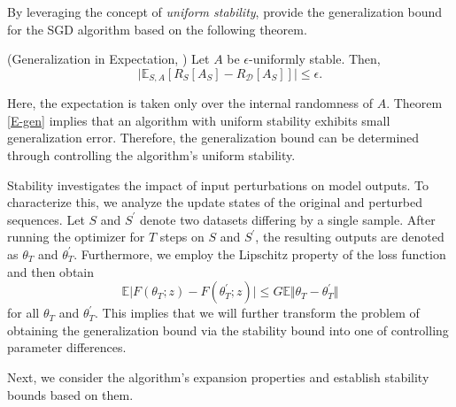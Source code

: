 By leveraging the concept of \emph{uniform stability}, \citet{hardt2016train} provide the generalization bound for the SGD algorithm based on the following theorem.
\begin{theorem}{\rm (Generalization in Expectation, \citet[Theorem 2.2]{hardt2016train})}\label{E-gen}
Let $A$ be $\epsilon$-uniformly stable. Then,
    \begin{equation}
     \vert\mathbb{E}_{S,A}\left[R_{S}\left[A_S\right]-R_\mathcal{D}\left[A_S\right]\right]\vert \leq \epsilon.
    \end{equation}
\end{theorem}

\begin{remark}
Here, the expectation is taken only over the internal randomness of $A$. Theorem \ref{E-gen} implies that an algorithm with uniform stability exhibits small generalization error. Therefore, the generalization bound can be determined through controlling the algorithm's uniform stability.   
\end{remark}


Stability investigates the impact of input perturbations on model outputs. To characterize this, we analyze the update states of the original and perturbed sequences. Let $S$ and $S^{\prime}$ denote two datasets differing by a single sample. After running the optimizer for $T$ steps on $S$ and $S^{\prime}$, the resulting outputs are denoted as $\theta_T$ and $\theta_T^{\prime}$. Furthermore, we employ the Lipschitz property of the loss function and then obtain
\begin{equation}\label{convex-basic}
\mathbb{E}\vert F(\theta_T;z)-F(\theta_T^{\prime};z)\vert \leq G \mathbb{E}\Vert \theta_T -\theta^{\prime}_T \Vert
 \end{equation}
for all $\theta_T$ and $\theta_T^{\prime}$.
This implies that we will further transform the problem of obtaining the generalization bound via the stability bound into one of controlling parameter differences. 

Next, we consider the algorithm's expansion properties and establish stability bounds based on them.

